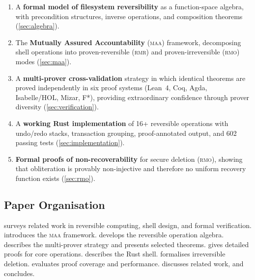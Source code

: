 \documentclass[11pt,a4paper]{article}
\newcommand{\rmr}{\textsc{rmr}}
\newcommand{\rmo}{\textsc{rmo}}
\newcommand{\maa}{\textsc{maa}}
\newcommand{\lean}{Lean~4}
\begin{document}
\begin{enumerate}[label=(\arabic*)]
  \item A \textbf{formal model of filesystem reversibility} as a function-space
        algebra, with precondition structures, inverse operations, and
        composition theorems (\cref{sec:algebra}).

  \item The \textbf{Mutually Assured Accountability} (\maa{}) framework,
        decomposing shell operations into proven-reversible (\rmr{}) and
        proven-irreversible (\rmo{}) modes (\cref{sec:maa}).

  \item A \textbf{multi-prover cross-validation} strategy in which identical
        theorems are proved independently in six proof systems (\lean{}, Coq,
        Agda, Isabelle/HOL, Mizar, F*), providing extraordinary confidence
        through prover diversity (\cref{sec:verification}).

  \item A \textbf{working Rust implementation} of 16+ reversible operations
        with undo/redo stacks, transaction grouping, proof-annotated output,
        and 602 passing tests (\cref{sec:implementation}).

  \item \textbf{Formal proofs of non-recoverability} for secure deletion
        (\rmo{}), showing that obliteration is provably non-injective and
        therefore no uniform recovery function exists (\cref{sec:rmo}).
\end{enumerate}

\subsection{Paper Organisation}

 surveys related work in reversible computing, shell
design, and formal verification.  introduces the \maa{}
framework.  develops the reversible operation algebra.
 describes the multi-prover strategy and presents
selected theorems.  gives detailed proofs for core
operations.  describes the Rust shell.
 formalises irreversible deletion. 
evaluates proof coverage and performance.  discusses related
work, and  concludes.

\end{document}
